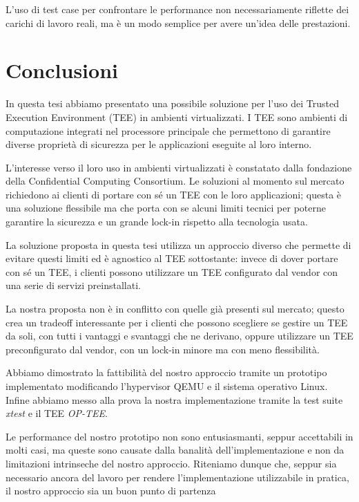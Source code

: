 \documentclass[12pt,italian]{report}
\begin{document}
L'uso di test case per confrontare le performance non necessariamente
riflette dei carichi di lavoro reali, ma è un modo semplice per avere
un'idea delle prestazioni.

\chapter{Conclusioni}
\label{chap:conclusioni}
In questa tesi abbiamo presentato una possibile soluzione per l'uso dei
Trusted Execution Environment (TEE) in ambienti virtualizzati.
I TEE sono ambienti di computazione integrati nel processore principale
che permettono di garantire diverse proprietà di sicurezza per le
applicazioni eseguite al loro interno.

L'interesse verso il loro uso in ambienti virtualizzati è constatato dalla
fondazione della Confidential Computing Consortium.
Le soluzioni al momento sul mercato richiedono ai clienti di portare con sé
un TEE con le loro applicazioni; questa è una soluzione flessibile ma che
porta con se alcuni limiti tecnici per poterne garantire la sicurezza
e un grande lock-in rispetto alla tecnologia usata.

La soluzione proposta in questa tesi utilizza un approccio diverso che
permette di evitare questi limiti ed è agnostico al TEE sottostante:
invece di dover portare con sé un TEE, i clienti possono utilizzare un TEE
configurato dal vendor con una serie di servizi preinstallati.

La nostra proposta non è in conflitto con quelle già presenti sul mercato;
questo crea un tradeoff interessante per i clienti che possono scegliere
se gestire un TEE da soli, con tutti i vantaggi e svantaggi che ne derivano,
oppure utilizzare un TEE preconfigurato dal vendor, con un lock-in minore
ma con meno flessibilità.

Abbiamo dimostrato la fattibilità del nostro approccio tramite un prototipo
implementato modificando l'hypervisor QEMU e il sistema operativo Linux.
Infine abbiamo messo alla prova la nostra implementazione tramite la test
suite \textit{xtest} e il TEE \textit{OP-TEE}.

Le performance del nostro prototipo non sono entusiasmanti, seppur accettabili
in molti casi, ma queste sono causate dalla banalità dell'implementazione e
non da limitazioni intrinseche del nostro approccio.
Riteniamo dunque che, seppur sia necessario ancora del lavoro per rendere
l'implementazione utilizzabile in pratica, il nostro approccio sia un buon
punto di partenza
\end{document}
